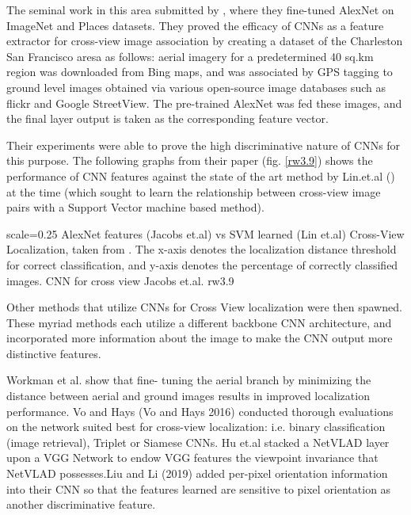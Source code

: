 The seminal work in this area submitted by \cite{Jacobs2015}, where they fine-tuned AlexNet on ImageNet and Places datasets. They proved the efficacy of CNNs as a feature extractor for cross-view image association by creating a dataset of the Charleston San Francisco aresa as follows: aerial imagery for a predetermined 40 sq.km region was downloaded from Bing maps, and was associated by GPS tagging to ground level images obtained via various open-source image databases such as flickr and Google StreetView. The pre-trained AlexNet was fed these images, and the final layer output is taken as the corresponding feature vector. 

Their experiments were able to prove the high discriminative nature of CNNs for this purpose. The following graphs from their paper (fig. \ref{rw3.9}) shows the performance of CNN features against the state of the art method by Lin.et.al (\cite{Lin2013}) at the time (which sought to learn the relationship between cross-view image pairs with a Support Vector machine based method).

{scale=0.25}%
{AlexNet features (Jacobs et.al) vs SVM learned (Lin et.al) Cross-View Localization, taken from \cite{Jacobs2015}. The x-axis denotes the localization distance threshold for correct classification, and y-axis denotes the percentage of correctly classified images.}%
{CNN for cross view Jacobs et.al.}%
{rw3.9} %

Other methods that utilize CNNs for Cross View localization were then spawned. These myriad methods each utilize a different backbone CNN architecture, and incorporated more information about the image to make the CNN output more distinctive features.

Workman et al. show that fine- tuning the aerial branch by minimizing the distance between aerial and ground images results in improved localization performance.  Vo and Hays (Vo and Hays 2016) conducted thorough evaluations on the network suited best for cross-view localization: i.e. binary classification (image retrieval), Triplet or Siamese CNNs. Hu et.al stacked a NetVLAD layer upon a VGG Network to endow VGG features the viewpoint invariance that NetVLAD possesses.Liu and Li (2019) added per-pixel orientation information into their CNN so that the features learned are sensitive to pixel orientation as another discriminative feature. 

